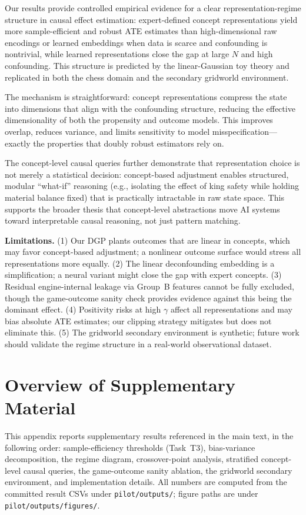 \documentclass{article}
\begin{document}
Our results provide controlled empirical evidence for a clear representation-regime
structure in causal effect estimation: expert-defined concept representations yield
more sample-efficient and robust ATE estimates than high-dimensional raw encodings
or learned embeddings when data is scarce and confounding is nontrivial, while
learned representations close the gap at large $N$ and high confounding. This
structure is predicted by the linear-Gaussian toy theory and replicated in both the
chess domain and the secondary gridworld environment.

The mechanism is straightforward: concept representations compress the state into
dimensions that align with the confounding structure, reducing the effective
dimensionality of both the propensity and outcome models. This improves overlap,
reduces variance, and limits sensitivity to model misspecification---exactly the
properties that doubly robust estimators rely on.

The concept-level causal queries further demonstrate that representation choice is
not merely a statistical decision: concept-based adjustment enables structured,
modular ``what-if'' reasoning (e.g., isolating the effect of king safety while
holding material balance fixed) that is practically intractable in raw state space.
This supports the broader thesis that concept-level abstractions move AI systems
toward interpretable causal reasoning, not just pattern matching.

\textbf{Limitations.}
(1) Our DGP plants outcomes that are linear in concepts, which may favor
concept-based adjustment; a nonlinear outcome surface would stress all
representations more equally.
(2) The linear deconfounding embedding is a simplification; a neural variant might
close the gap with expert concepts.
(3) Residual engine-internal leakage via Group~B features cannot be fully excluded,
though the game-outcome sanity check provides evidence against this being the
dominant effect.
(4) Positivity risks at high $\gamma$ affect all representations and may bias
absolute ATE estimates; our clipping strategy mitigates but does not eliminate this.
(5) The gridworld secondary environment is synthetic; future work should validate
the regime structure in a real-world observational dataset.




\appendix

\section{Overview of Supplementary Material}
This appendix reports supplementary results referenced in the main text, in the
following order: sample-efficiency thresholds (Task~T3), bias-variance
decomposition, the regime diagram, crossover-point analysis, stratified
concept-level causal queries, the game-outcome sanity ablation, the gridworld
secondary environment, and implementation details. All numbers are computed
from the committed result CSVs under \texttt{pilot/outputs/}; figure paths are
under \texttt{pilot/outputs/figures/}.
\end{document}

